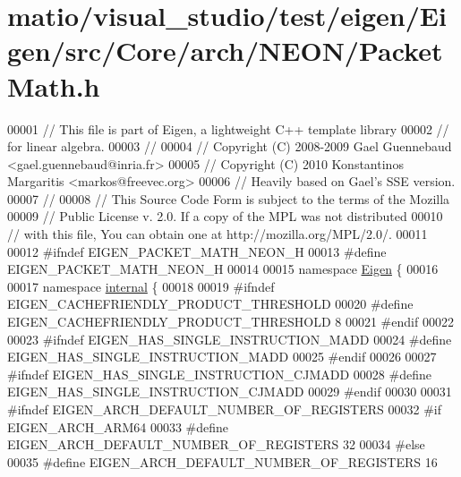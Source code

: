 \hypertarget{matio_2visual__studio_2test_2eigen_2_eigen_2src_2_core_2arch_2_n_e_o_n_2_packet_math_8h_source}{}\section{matio/visual\+\_\+studio/test/eigen/\+Eigen/src/\+Core/arch/\+N\+E\+O\+N/\+Packet\+Math.h}
\label{matio_2visual__studio_2test_2eigen_2_eigen_2src_2_core_2arch_2_n_e_o_n_2_packet_math_8h_source}

\begin{DoxyCode}
00001 \textcolor{comment}{// This file is part of Eigen, a lightweight C++ template library}
00002 \textcolor{comment}{// for linear algebra.}
00003 \textcolor{comment}{//}
00004 \textcolor{comment}{// Copyright (C) 2008-2009 Gael Guennebaud <gael.guennebaud@inria.fr>}
00005 \textcolor{comment}{// Copyright (C) 2010 Konstantinos Margaritis <markos@freevec.org>}
00006 \textcolor{comment}{// Heavily based on Gael's SSE version.}
00007 \textcolor{comment}{//}
00008 \textcolor{comment}{// This Source Code Form is subject to the terms of the Mozilla}
00009 \textcolor{comment}{// Public License v. 2.0. If a copy of the MPL was not distributed}
00010 \textcolor{comment}{// with this file, You can obtain one at http://mozilla.org/MPL/2.0/.}
00011 
00012 \textcolor{preprocessor}{#ifndef EIGEN\_PACKET\_MATH\_NEON\_H}
00013 \textcolor{preprocessor}{#define EIGEN\_PACKET\_MATH\_NEON\_H}
00014 
00015 \textcolor{keyword}{namespace }\hyperlink{namespace_eigen}{Eigen} \{
00016 
00017 \textcolor{keyword}{namespace }\hyperlink{namespaceinternal}{internal} \{
00018 
00019 \textcolor{preprocessor}{#ifndef EIGEN\_CACHEFRIENDLY\_PRODUCT\_THRESHOLD}
00020 \textcolor{preprocessor}{#define EIGEN\_CACHEFRIENDLY\_PRODUCT\_THRESHOLD 8}
00021 \textcolor{preprocessor}{#endif}
00022 
00023 \textcolor{preprocessor}{#ifndef EIGEN\_HAS\_SINGLE\_INSTRUCTION\_MADD}
00024 \textcolor{preprocessor}{#define EIGEN\_HAS\_SINGLE\_INSTRUCTION\_MADD}
00025 \textcolor{preprocessor}{#endif}
00026 
00027 \textcolor{preprocessor}{#ifndef EIGEN\_HAS\_SINGLE\_INSTRUCTION\_CJMADD}
00028 \textcolor{preprocessor}{#define EIGEN\_HAS\_SINGLE\_INSTRUCTION\_CJMADD}
00029 \textcolor{preprocessor}{#endif}
00030 
00031 \textcolor{preprocessor}{#ifndef EIGEN\_ARCH\_DEFAULT\_NUMBER\_OF\_REGISTERS}
00032 \textcolor{preprocessor}{#if EIGEN\_ARCH\_ARM64}
00033 \textcolor{preprocessor}{#define EIGEN\_ARCH\_DEFAULT\_NUMBER\_OF\_REGISTERS 32}
00034 \textcolor{preprocessor}{#else}
00035 \textcolor{preprocessor}{#define EIGEN\_ARCH\_DEFAULT\_NUMBER\_OF\_REGISTERS 16 }

\end{DoxyCode}
